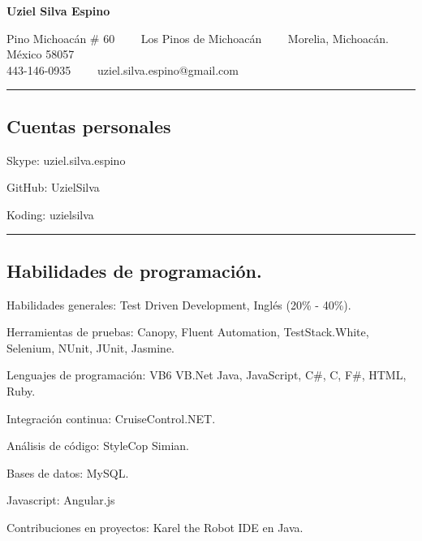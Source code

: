 \documentclass[10pt,letterpaper]{article}
\newenvironment{indentsection}[1]%
{\begin{list}{}%
	{\setlength{\leftmargin}{#1}}%
	\item[]%
}
{\end{list}}
\begin{document}
\begin{center}
{\LARGE \textbf{Uziel Silva Espino}}

Pino Michoacán \# 60\ \ \textbullet
\ \ Los Pinos de Michoacán\ \ \textbullet
\ \ Morelia, Michoacán. México 58057
\\
443-146-0935\ \ \textbullet
\ \ uziel.silva.espino@gmail.com
\end{center}

\hrule
\vspace{-0.4em}
\subsection*{Cuentas personales}

\begin{indentsection}{\parindent}
\begin{description*}
	\item[Skype:]
	uziel.silva.espino
	\item[GitHub:]
	UzielSilva
	\item[Koding:]
	uzielsilva
	
\end{description*}
\end{indentsection}

\hrule
\vspace{-0.4em}
\subsection*{Habilidades de programación.}

\begin{indentsection}{\parindent}
\begin{description*}
	\item[Habilidades generales:]
	Test Driven Development, Inglés (20\% - 40\%). 
	
	\item[Herramientas de pruebas:]
	Canopy,
	Fluent Automation,
	TestStack.White,
	Selenium,
	NUnit,
	JUnit,
	Jasmine.
	
	\item[Lenguajes de programación:]
	VB6
	VB.Net
	Java,
	JavaScript,
	C\#,
	C,
	F\#,
	HTML,
	Ruby. 
	
	\item[Integración continua:]
	CruiseControl.NET. 
	
	\item[Análisis de código:]
	StyleCop
	Simian. 
	
	\item[Bases de datos:]
	MySQL.
	
	\item[Javascript:]
	Angular.js
	
	\item[Contribuciones en proyectos:]
	Karel the Robot IDE en Java.
	
\end{description*}
\end{indentsection}
\end{document}

